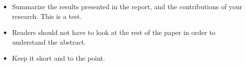 \begin{itemize}

\item Summarize the results presented in the report, and the contributions
of your research. This is a test. 

\item Readers should not have to look at the rest of the paper in order to 
understand the abstract.

\item Keep it short and to the point.
\end{itemize}
